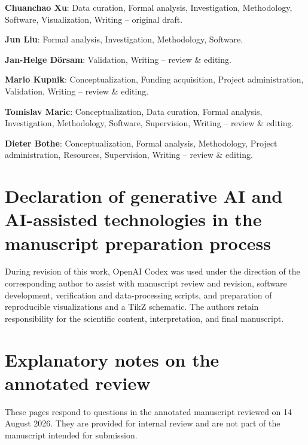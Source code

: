 \documentclass[final,12pt,nopreprintline,longtitle]{elsarticle}
\newcommand{\paperroot}{}
\newcommand{\paperroot}{paper_aHF/}
\newcommand{\paperbibliography}[1]{}
\newif\ifinternalreviewnotes
\begin{document}
\noindent\textbf{Chuanchao Xu}: Data curation, Formal analysis, Investigation, Methodology, Software, Visualization, Writing -- original draft.

\noindent\textbf{Jun Liu}: Formal analysis, Investigation, Methodology, Software.

\noindent\textbf{Jan-Helge Dörsam}: Validation, Writing -- review \& editing.

\noindent\textbf{Mario Kupnik}: Conceptualization, Funding acquisition, Project administration, Validation, Writing -- review \& editing.

\noindent\textbf{Tomislav Maric}: Conceptualization, Data curation, Formal analysis, Investigation, Methodology, Software, Supervision, Writing -- review \& editing.

\noindent\textbf{Dieter Bothe}: Conceptualization, Formal analysis, Methodology, Project administration, Resources, Supervision, Writing -- review \& editing.

\section*{Declaration of generative AI and AI-assisted technologies in the manuscript preparation process}

During revision of this work, OpenAI Codex was used under the direction of
the corresponding author to assist with manuscript review and revision,
software development, verification and data-processing scripts, and
preparation of reproducible visualizations and a TikZ schematic.  The
authors retain responsibility for the scientific content, interpretation,
and final manuscript.


\paperbibliography{bibliography}

\ifinternalreviewnotes
\clearpage
\nolinenumbers
\section*{Explanatory notes on the annotated review}
\footnotesize
\noindent
These pages respond to questions in the annotated manuscript reviewed on
14 August 2026.  They are provided for internal review and are not part of the
manuscript intended for submission.
\end{document}
